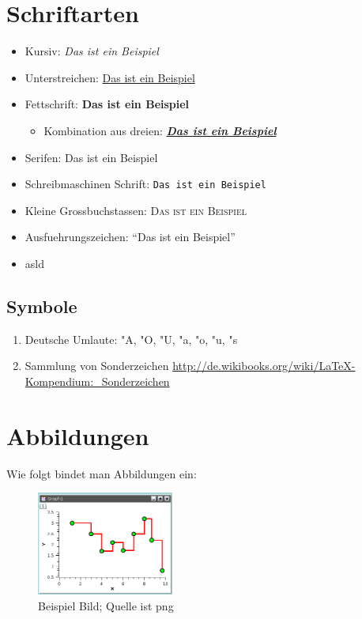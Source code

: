 \documentclass[a4paper,12pt,headsepline]{report}
\begin{document}
		\section{Schriftarten}
		\label{sec:schriftarten} 
			\begin{itemize}
				\item Kursiv: \emph{Das ist ein Beispiel}
				\item Unterstreichen: \underline{Das ist ein Beispiel}
				\item Fettschrift: \textbf{Das ist ein Beispiel}
				\begin{itemize} 
					\item Kombination aus dreien: \underline{\textbf{\emph{Das ist ein Beispiel}}}						\end{itemize} 
				\item Serifen: \textsf{Das ist ein Beispiel}
				\item Schreibmaschinen Schrift: \texttt{Das ist ein Beispiel}
				\item Kleine Grossbuchstassen: \textsc{Das ist ein Beispiel}
				\item Ausfuehrungszeichen: ``Das ist ein Beispiel''
				\item asld
			\end{itemize}
			
		
			\subsection{Symbole}
				\begin{enumerate}
				\item Deutsche Umlaute: "A, "O, "U, "a, "o, "u, "s
				\item Sammlung von Sonderzeichen \url{http://de.wikibooks.org/wiki/LaTeX-Kompendium:_Sonderzeichen}
				\end{enumerate}
				

	\section{Abbildungen}
		Wie folgt bindet man Abbildungen ein:
		\begin{figure}[htb]
		 \centering
		 \includegraphics[width=0.4\textwidth,angle=0]{Abb/beispiel}
 		\caption{Beispiel Bild; Quelle ist png}
		\label{fig:beispiel}
		\end{figure}
	
\end{document}
